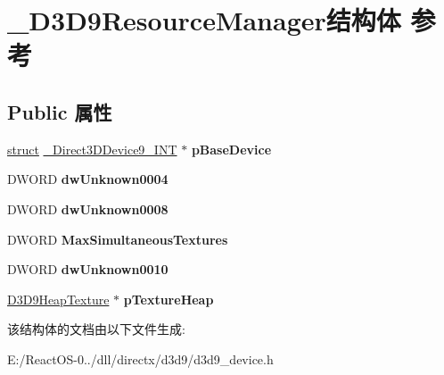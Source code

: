 \hypertarget{struct___d3_d9_resource_manager}{}\section{\+\_\+\+D3\+D9\+Resource\+Manager结构体 参考}
\label{struct___d3_d9_resource_manager}
\subsection*{Public 属性}
\begin{DoxyCompactItemize}
\item 
\mbox{\label{struct___d3_d9_resource_manager_a5bb6b9709de92ddd9f00661efc2d7535}} 
\hyperlink{interfacestruct}{struct} \hyperlink{struct___direct3_d_device9___i_n_t}{\+\_\+\+Direct3\+D\+Device9\+\_\+\+I\+NT} $\ast$ {\bfseries p\+Base\+Device}
\item 
\mbox{\label{struct___d3_d9_resource_manager_ae0961dc73fd620c7325525010c23268d}} 
D\+W\+O\+RD {\bfseries dw\+Unknown0004}
\item 
\mbox{\label{struct___d3_d9_resource_manager_a8da0179355e8e1055b8f24ee13965f5e}} 
D\+W\+O\+RD {\bfseries dw\+Unknown0008}
\item 
\mbox{\label{struct___d3_d9_resource_manager_a3a0d58cd6da5058d1e81ec7d6257656b}} 
D\+W\+O\+RD {\bfseries Max\+Simultaneous\+Textures}
\item 
\mbox{\label{struct___d3_d9_resource_manager_a2564e8e3ec2bf406cafa782f6d4b85e7}} 
D\+W\+O\+RD {\bfseries dw\+Unknown0010}
\item 
\mbox{\label{struct___d3_d9_resource_manager_af8b7dc029063bafa4cd6c722996bac45}} 
\hyperlink{struct___d3_d9_heap_texture}{D3\+D9\+Heap\+Texture} $\ast$ {\bfseries p\+Texture\+Heap}
\end{DoxyCompactItemize}


该结构体的文档由以下文件生成\+:\begin{DoxyCompactItemize}
\item 
E\+:/\+React\+O\+S-\/0../dll/directx/d3d9/d3d9\+\_\+device.\+h\end{DoxyCompactItemize}

